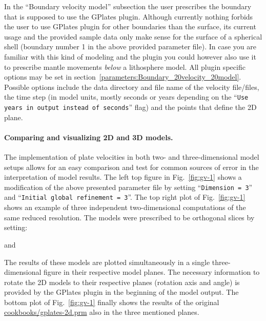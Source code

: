 \documentclass{article}
\begin{document}
In the ``Boundary velocity model'' subsection the user prescribes the boundary that is supposed to
use the GPlates plugin. Although currently nothing forbids the user to use GPlates plugin for other
boundaries than the surface, its current usage and the provided sample data only make sense
for the surface of a spherical shell (boundary number 1 in the above provided parameter file). 
In case you are familiar with this kind of modeling and the plugin you could however also use it to prescribe mantle
movements \textit{below} a lithosphere model. All plugin specific options may be set in 
section~\ref{parameters:Boundary_20velocity_20model}. Possible options include the data directory
and file name of the velocity file/files, the time step (in model units, mostly seconds or years depending on the 
``\texttt{Use years in output instead of seconds}'' flag) and the points that define the 2D plane.

\paragraph{Comparing and visualizing 2D and 3D models.}

The implementation of plate velocities in both two- and three-dimensional model
setups allows for an easy comparison and test for common sources of error
in the interpretation of model results. The left top figure in Fig.~\ref{fig:gv-1} 
shows a modification of the above presented parameter file by setting 
``\texttt{Dimension = 3}'' and ``\texttt{Initial global refinement = 3}''. 
The top right plot of Fig.~\ref{fig:gv-1} shows an example of three independent 
two-dimensional computations of the same reduced resolution. The models were prescribed 
to be orthogonal slices by setting:


and



The results of these models are plotted simultaneously in a single three-dimensional figure
in their respective model planes. The necessary information 
to rotate the 2D models to their respective planes (rotation axis and angle) is provided by the 
GPlates plugin in the beginning of the model output.  The bottom plot 
of Fig.~\ref{fig:gv-1} finally shows the results of the original \url{cookbooks/gplates-2d.prm} 
also in the three mentioned planes. 
\end{document}

